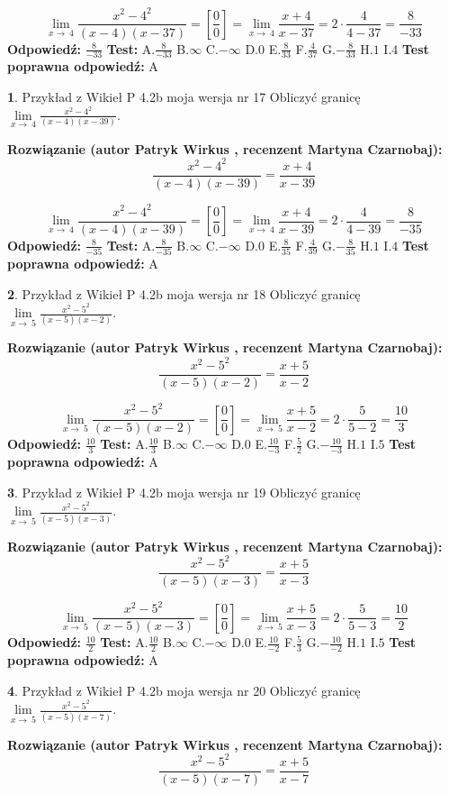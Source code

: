 \documentclass[12pt, a4paper]{article}
\theoremstyle{definition} %
\newtheorem{zad}{}
\newcommand{\zadStart}[1]{\begin{zad}#1\newline}
\newcommand{\zadStop}{\end{zad}}
\newcommand{\rozwStart}[2]{\noindent \textbf{Rozwiązanie (autor #1 , recenzent #2): }\newline}
\newcommand{\rozwStop}{\newline}
\newcommand{\odpStart}{\noindent \textbf{Odpowiedź:}\newline}
\newcommand{\odpStop}{\newline}
\newcommand{\testStart}{\noindent \textbf{Test:}\newline}
\newcommand{\testStop}{\newline}
\newcommand{\kluczStart}{\noindent \textbf{Test poprawna odpowiedź:}\newline}
\newcommand{\kluczStop}{\newline}
\begin{document}
$$\lim\limits_{x\to\ 4}\frac{x^{2}-4^{2}}{(x-4)(x-37)}=[\frac{0}{0}]=\lim\limits_{x\to\ 4}\frac{x+4}{x-37}=2 \cdot \frac{4}{4-37} = \frac{8}{-33}$$
\rozwStop
\odpStart
$\frac{8}{-33}$
\odpStop
\testStart
A.$\frac{8}{-33}$
B.$\infty$
C.$-\infty$
D.$0$
E.$\frac{8}{33}$
F.$\frac{4}{37}$
G.$-\frac{8}{33}$
H.$1$
I.$4$
\testStop
\kluczStart
A
\kluczStop



\zadStart{Przykład z Wikieł P 4.2b moja wersja nr 17}
Obliczyć granicę $\lim\limits_{x\to\ 4}\frac{x^{2}-4^{2}}{(x-4)(x-39)}$.
\zadStop
\rozwStart{Patryk Wirkus}{Martyna Czarnobaj}
$$\frac{x^{2}-4^{2}}{(x-4)(x-39)}=\frac{x+4}{x-39}$$

$$\lim\limits_{x\to\ 4}\frac{x^{2}-4^{2}}{(x-4)(x-39)}=[\frac{0}{0}]=\lim\limits_{x\to\ 4}\frac{x+4}{x-39}=2 \cdot \frac{4}{4-39} = \frac{8}{-35}$$
\rozwStop
\odpStart
$\frac{8}{-35}$
\odpStop
\testStart
A.$\frac{8}{-35}$
B.$\infty$
C.$-\infty$
D.$0$
E.$\frac{8}{35}$
F.$\frac{4}{39}$
G.$-\frac{8}{35}$
H.$1$
I.$4$
\testStop
\kluczStart
A
\kluczStop



\zadStart{Przykład z Wikieł P 4.2b moja wersja nr 18}
Obliczyć granicę $\lim\limits_{x\to\ 5}\frac{x^{2}-5^{2}}{(x-5)(x-2)}$.
\zadStop
\rozwStart{Patryk Wirkus}{Martyna Czarnobaj}
$$\frac{x^{2}-5^{2}}{(x-5)(x-2)}=\frac{x+5}{x-2}$$

$$\lim\limits_{x\to\ 5}\frac{x^{2}-5^{2}}{(x-5)(x-2)}=[\frac{0}{0}]=\lim\limits_{x\to\ 5}\frac{x+5}{x-2}=2 \cdot \frac{5}{5-2} = \frac{10}{3}$$
\rozwStop
\odpStart
$\frac{10}{3}$
\odpStop
\testStart
A.$\frac{10}{3}$
B.$\infty$
C.$-\infty$
D.$0$
E.$\frac{10}{-3}$
F.$\frac{5}{2}$
G.$-\frac{10}{-3}$
H.$1$
I.$5$
\testStop
\kluczStart
A
\kluczStop



\zadStart{Przykład z Wikieł P 4.2b moja wersja nr 19}
Obliczyć granicę $\lim\limits_{x\to\ 5}\frac{x^{2}-5^{2}}{(x-5)(x-3)}$.
\zadStop
\rozwStart{Patryk Wirkus}{Martyna Czarnobaj}
$$\frac{x^{2}-5^{2}}{(x-5)(x-3)}=\frac{x+5}{x-3}$$

$$\lim\limits_{x\to\ 5}\frac{x^{2}-5^{2}}{(x-5)(x-3)}=[\frac{0}{0}]=\lim\limits_{x\to\ 5}\frac{x+5}{x-3}=2 \cdot \frac{5}{5-3} = \frac{10}{2}$$
\rozwStop
\odpStart
$\frac{10}{2}$
\odpStop
\testStart
A.$\frac{10}{2}$
B.$\infty$
C.$-\infty$
D.$0$
E.$\frac{10}{-2}$
F.$\frac{5}{3}$
G.$-\frac{10}{-2}$
H.$1$
I.$5$
\testStop
\kluczStart
A
\kluczStop



\zadStart{Przykład z Wikieł P 4.2b moja wersja nr 20}
Obliczyć granicę $\lim\limits_{x\to\ 5}\frac{x^{2}-5^{2}}{(x-5)(x-7)}$.
\zadStop
\rozwStart{Patryk Wirkus}{Martyna Czarnobaj}
$$\frac{x^{2}-5^{2}}{(x-5)(x-7)}=\frac{x+5}{x-7}$$
\end{document}

